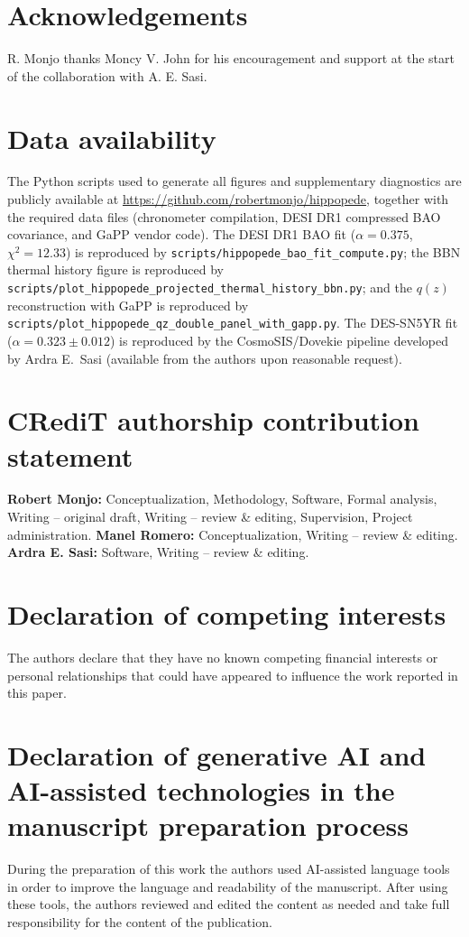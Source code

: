 \documentclass[3p,times,twocolumn]{elsarticle}
\begin{document}
\section*{Acknowledgements}
R. Monjo thanks Moncy V. John for his encouragement and support at the start of the collaboration with A. E. Sasi.

\section*{Data availability}

The Python scripts used to generate all figures and supplementary diagnostics are publicly available at \url{https://github.com/robertmonjo/hippopede}, together with the required data files (chronometer compilation, DESI DR1 compressed BAO covariance, and GaPP vendor code). The DESI DR1 BAO fit ($\alpha=0.375$, $\chi^2=12.33$) is reproduced by \texttt{scripts/hippopede\_bao\_fit\_compute.py}; the BBN thermal history figure is reproduced by \texttt{scripts/plot\_hippopede\_projected\_thermal\_history\_bbn.py}; and the $q(z)$ reconstruction with GaPP is reproduced by \texttt{scripts/plot\_hippopede\_qz\_double\_panel\_with\_gapp.py}. The DES-SN5YR fit ($\alpha=0.323\pm0.012$) is reproduced by the CosmoSIS/Dovekie pipeline developed by Ardra E.\ Sasi (available from the authors upon reasonable request).

\section*{CRediT authorship contribution statement}
\textbf{Robert Monjo:} Conceptualization, Methodology, Software, Formal analysis, Writing -- original draft, Writing -- review \& editing, Supervision, Project administration. \textbf{Manel Romero:} Conceptualization, Writing -- review \& editing. \textbf{Ardra E. Sasi:} Software, Writing -- review \& editing.

\section*{Declaration of competing interests}
The authors declare that they have no known competing financial interests or personal relationships that could have appeared to influence the work reported in this paper.

\section*{Declaration of generative AI and AI-assisted technologies in the manuscript preparation process}
During the preparation of this work the authors used AI-assisted language tools in order to improve the language and readability of the manuscript. After using these tools, the authors reviewed and edited the content as needed and take full responsibility for the content of the publication.
\end{document}
